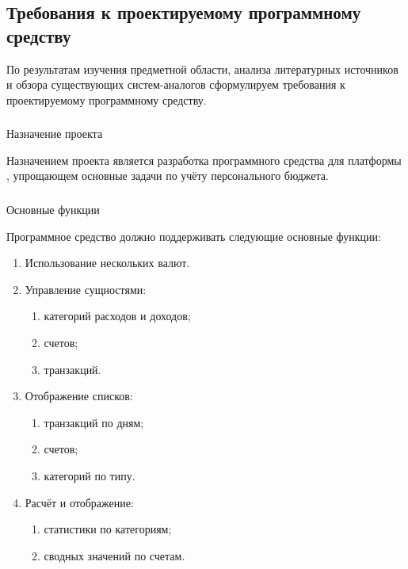 \subsection{Требования к проектируемому программному средству}
\label{sec:analysis:specification}

По результатам изучения предметной области, анализа литературных источников и обзора существующих систем-аналогов сформулируем требования к проектируемому программному средству.

\subsubsection{} Назначение проекта
\label{sec:analysis:specification:purpose}

Назначением проекта является разработка программного средства для платформы \andro, упрощающем основные задачи по учёту персонального бюджета.

\subsubsection{} Основные функции
\label{sec:analysis:specification:functions}

Программное средство должно поддерживать следующие основные фун\-к\-ции:

\begin{enumerate}
    \item Использование нескольких валют.
    \item Управление сущностями:
    \begin{enumerate}
        \item категорий расходов и доходов;
        \item счетов;
        \item транзакций.
    \end{enumerate}
    \item Отображение списков:
    \begin{enumerate}
        \item транзакций по дням;
        \item счетов;
        \item категорий по типу.
    \end{enumerate}
    \item Расчёт и отображение:
    \begin{enumerate}
        \item статистики по категориям;
        \item сводных значений по счетам.
    \end{enumerate}
\end{enumerate}

